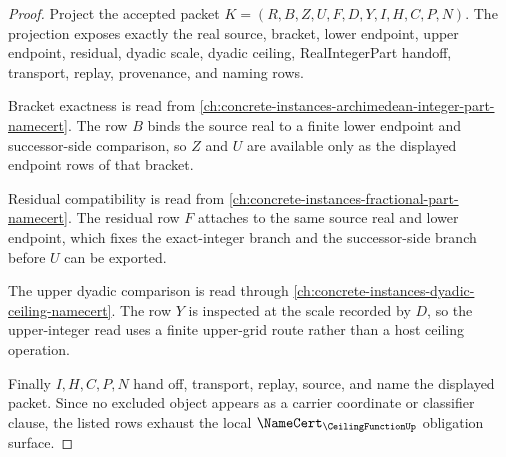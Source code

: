 \begin{proof}
Project the accepted packet $K=(R,B,Z,U,F,D,Y,I,H,C,P,N)$. The projection exposes exactly the real source, bracket, lower endpoint, upper endpoint, residual, dyadic scale, dyadic ceiling, RealIntegerPart handoff, transport, replay, provenance, and naming rows.

Bracket exactness is read from \autoref{ch:concrete-instances-archimedean-integer-part-namecert}. The row $B$ binds the source real to a finite lower endpoint and successor-side comparison, so $Z$ and $U$ are available only as the displayed endpoint rows of that bracket.

Residual compatibility is read from \autoref{ch:concrete-instances-fractional-part-namecert}. The residual row $F$ attaches to the same source real and lower endpoint, which fixes the exact-integer branch and the successor-side branch before $U$ can be exported.

The upper dyadic comparison is read through \autoref{ch:concrete-instances-dyadic-ceiling-namecert}. The row $Y$ is inspected at the scale recorded by $D$, so the upper-integer read uses a finite upper-grid route rather than a host ceiling operation.

Finally $I,H,C,P,N$ hand off, transport, replay, source, and name the displayed packet. Since no excluded object appears as a carrier coordinate or classifier clause, the listed rows exhaust the local $\NameCert_{\CeilingFunctionUp}$ obligation surface.
\end{proof}

